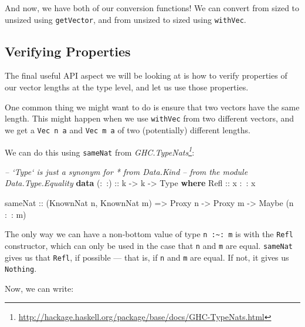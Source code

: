\documentclass[]{article}
\newenvironment{Shaded}{}{}
\newcommand{\KeywordTok}[1]{\textcolor[rgb]{0.00,0.44,0.13}{\textbf{#1}}}
\newcommand{\DataTypeTok}[1]{\textcolor[rgb]{0.56,0.13,0.00}{#1}}
\newcommand{\CommentTok}[1]{\textcolor[rgb]{0.38,0.63,0.69}{\textit{#1}}}
\newcommand{\OtherTok}[1]{\textcolor[rgb]{0.00,0.44,0.13}{#1}}
\newcommand{\FunctionTok}[1]{\textcolor[rgb]{0.02,0.16,0.49}{#1}}
\newcommand{\NormalTok}[1]{#1}
\renewcommand{\href}[2]{#2\footnote{\url{#1}}}
\begin{document}
And now, we have both of our conversion functions! We can convert from sized to
unsized using \texttt{getVector}, and from unsized to sized using
\texttt{withVec}.

\subsection{Verifying Properties}\label{verifying-properties}

The final useful API aspect we will be looking at is how to verify properties of
our vector lengths at the type level, and let us use those properties.

One common thing we might want to do is ensure that two vectors have the same
length. This might happen when we use \texttt{withVec} from two different
vectors, and we get a \texttt{Vec\ n\ a} and \texttt{Vec\ m\ a} of two
(potentially) different lengths.

We can do this using \texttt{sameNat} from
\emph{\href{http://hackage.haskell.org/package/base/docs/GHC-TypeNats.html}{GHC.TypeNats}}:

\begin{Shaded}
\begin{Highlighting}[]
\CommentTok{-- `Type` is just a synonym for * from Data.Kind}
\CommentTok{-- from the module Data.Type.Equality}
\KeywordTok{data}\OtherTok{ (:~:) ::}\NormalTok{ k }\OtherTok{->}\NormalTok{ k }\OtherTok{->} \DataTypeTok{Type} \KeywordTok{where}
    \DataTypeTok{Refl}\OtherTok{ ::}\NormalTok{ x }\FunctionTok{:~:}\NormalTok{ x}

\NormalTok{sameNat}
\OtherTok{    ::}\NormalTok{ (}\DataTypeTok{KnownNat}\NormalTok{ n, }\DataTypeTok{KnownNat}\NormalTok{ m)}
    \OtherTok{=>} \DataTypeTok{Proxy}\NormalTok{ n}
    \OtherTok{->} \DataTypeTok{Proxy}\NormalTok{ m}
    \OtherTok{->} \DataTypeTok{Maybe}\NormalTok{ (n }\FunctionTok{:~:}\NormalTok{ m)}
\end{Highlighting}
\end{Shaded}

The only way we can have a non-bottom value of type
\texttt{n\ :\textasciitilde{}:\ m} is with the \texttt{Refl} constructor, which
can only be used in the case that \texttt{n} and \texttt{m} are equal.
\texttt{sameNat} gives us that \texttt{Refl}, if possible --- that is, if
\texttt{n} and \texttt{m} are equal. If not, it gives us \texttt{Nothing}.

Now, we can write:
\end{document}
